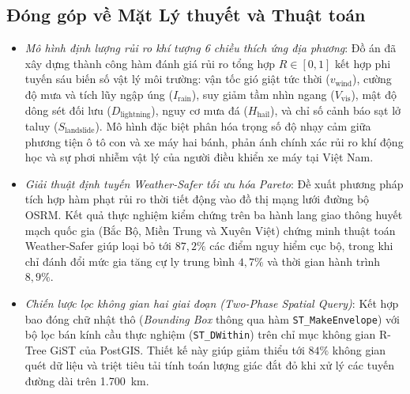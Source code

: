 \subsection{Đóng góp về Mặt Lý thuyết và Thuật toán}
\begin{itemize}
    \item[-] \textit{Mô hình định lượng rủi ro khí tượng 6 chiều thích ứng địa phương}: Đồ án đã xây dựng thành công hàm đánh giá rủi ro tổng hợp $R \in [0, 1]$ kết hợp phi tuyến sáu biến số vật lý môi trường: vận tốc gió giật tức thời ($v_{\text{wind}}$), cường độ mưa và tích lũy ngập úng ($I_{\text{rain}}$), suy giảm tầm nhìn ngang ($V_{\text{vis}}$), mật độ dông sét đối lưu ($D_{\text{lightning}}$), nguy cơ mưa đá ($H_{\text{hail}}$), và chỉ số cảnh báo sạt lở taluy ($S_{\text{landslide}}$). Mô hình đặc biệt phân hóa trọng số độ nhạy cảm giữa phương tiện ô tô con và xe máy hai bánh, phản ánh chính xác rủi ro khí động học và sự phơi nhiễm vật lý của người điều khiển xe máy tại Việt Nam.
    \item[-] \textit{Giải thuật định tuyến Weather-Safer tối ưu hóa Pareto}: Đề xuất phương pháp tích hợp hàm phạt rủi ro thời tiết động vào đồ thị mạng lưới đường bộ OSRM. Kết quả thực nghiệm kiểm chứng trên ba hành lang giao thông huyết mạch quốc gia (Bắc Bộ, Miền Trung và Xuyên Việt) chứng minh thuật toán Weather-Safer giúp loại bỏ tới $87,2\%$ các điểm nguy hiểm cục bộ, trong khi chỉ đánh đổi mức gia tăng cự ly trung bình $4,7\%$ và thời gian hành trình $8,9\%$.
    \item[-] \textit{Chiến lược lọc không gian hai giai đoạn (Two-Phase Spatial Query)}: Kết hợp bao đóng chữ nhật thô (\textit{Bounding Box} thông qua hàm \texttt{ST\_MakeEnvelope}) với bộ lọc bán kính cầu thực nghiệm (\texttt{ST\_DWithin}) trên chỉ mục không gian R-Tree GiST của PostGIS. Thiết kế này giúp giảm thiểu tới $84\%$ không gian quét dữ liệu và triệt tiêu tải tính toán lượng giác đắt đỏ khi xử lý các tuyến đường dài trên 1.700~km.
\end{itemize}

